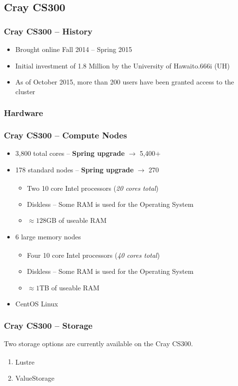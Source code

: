 \documentclass[t,hyperref={pdfpagelabels=false}]{beamer}
\newlength{\okinalen}
\newcommand{\okina}{\hbox to.666\okinalen{\hss`\hss}}
\newcommand{\regtrademark}{\fontsize{5}{6}\selectfont \textsuperscript{\textregistered}}
\newcommand{\hawaii}{Hawai{\okina}i}
\newcommand{\lustre}{Lustre{\regtrademark}}
\newcommand{\intel}{Intel{\regtrademark}}
\begin{document}
\subsection{Cray CS300}
\begin{frame}
\frametitle{Cray CS300 -- History}
\begin{itemize}
		\item Brought online Fall 2014 -- Spring 2015
		\item Initial investment of 1.8 Million by the University of {\hawaii} (UH)
		\item As of October 2015, more than 200 users have been granted access to the cluster
	\end{itemize}
\end{frame}


\subsubsection{Hardware}
\begin{frame}
	\frametitle{Cray CS300 -- Compute Nodes}
	\begin{itemize}
		\item 3,800 total cores -- \textbf{Spring upgrade} $\rightarrow$ 5,400$+$
		\item 178 standard nodes -- \textbf{Spring upgrade} $\rightarrow$ 270
			\begin{itemize}
				\item Two 10 core {\intel} processors (\emph{20 cores total})
				\item Diskless -- Some RAM is used for the Operating System
				\item $\approx128$GB of useable RAM
			\end{itemize}
		\item 6 large memory nodes
			\begin{itemize}
				\item Four 10 core {\intel} processors (\emph{40 cores total})
				\item Diskless -- Some RAM is used for the Operating System
				\item $\approx1$TB of useable RAM
			\end{itemize}			
		\item CentOS Linux
	\end{itemize}
\end{frame}


\begin{frame}
	\frametitle{Cray CS300 -- Storage}
	Two storage options are currently available on the Cray CS300.
	\begin{enumerate}
		\item {\lustre}
		\item ValueStorage
	\end{enumerate}
\end{frame}
\end{document}
